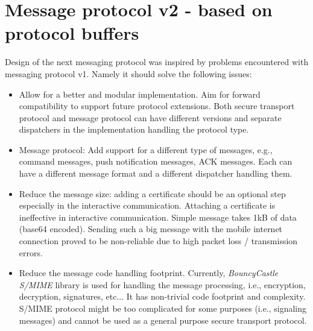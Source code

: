 \documentclass[a4paper,10pt]{article}
\begin{document}
\section{Message protocol v2 - based on protocol buffers}

Design of the next messaging protocol was inspired by problems encountered with messaging protocol v1. 
Namely it should solve the following issues:

\begin{itemize}
 \item Allow for a better and modular implementation. Aim for forward compatibility to support future protocol extensions.
 Both secure transport protocol and message protocol can have different versions and separate dispatchers in the implementation
 handling the protocol type.
 \item Message protocol: Add support for a different type of messages, e.g., command messages, push notification messages, ACK messages. Each
 can have a different message format and a different dispatcher handling them.
 \item Reduce the message size: adding a certificate should be an optional step especially in the interactive communication. Attaching a 
 certificate is ineffective in interactive communication. Simple message takes 1kB of data (base64 encoded). Sending such a big message
 with the mobile internet connection proved to be non-reliable due to high packet loss / transmission errors. 
 \item Reduce the message code handling footprint. Currently, {\it BouncyCastle S/MIME} library is used for handling the message 
 processing, i.e., encryption, decryption, signatures, etc... It has non-trivial code footprint and complexity. S/MIME protocol
 might be too complicated for some purposes (i.e., signaling messages) and cannot be used as a general purpose secure transport protocol.
\end{itemize}
\end{document}
